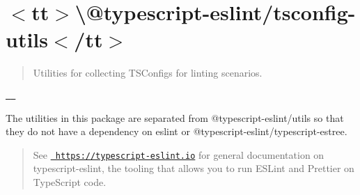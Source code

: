 \chapter{\texorpdfstring{$<$}{<}tt\texorpdfstring{$>$}{>}\textbackslash{}@typescript-\/eslint/tsconfig-\/utils\texorpdfstring{$<$}{<}/tt\texorpdfstring{$>$}{>}}
\hypertarget{md__project5___h_r_2_project5___h_r___front___end_2node__modules_2_0dtypescript-eslint_2tsconfig-utils_2_r_e_a_d_m_e}{}\label{md__project5___h_r_2_project5___h_r___front___end_2node__modules_2_0dtypescript-eslint_2tsconfig-utils_2_r_e_a_d_m_e}
\label{md__project5___h_r_2_project5___h_r___front___end_2node__modules_2_0dtypescript-eslint_2tsconfig-utils_2_r_e_a_d_m_e_autotoc_md474}%
%
 \begin{quote}
Utilities for collecting TSConfigs for linting scenarios. \end{quote}
\href{https://www.npmjs.com/package/@typescript-eslint/tsconfig-utils}{\texttt{ }} \href{https://www.npmjs.com/package/@typescript-eslint/tsconfig-utils}{\texttt{ }}

The utilities in this package are separated from {\ttfamily @typescript-\/eslint/utils} so that they do not have a dependency on {\ttfamily eslint} or {\ttfamily @typescript-\/eslint/typescript-\/estree}.

\begin{quote}
See \href{https://typescript-eslint.io}{\texttt{ https\+://typescript-\/eslint.\+io}} for general documentation on typescript-\/eslint, the tooling that allows you to run ESLint and Prettier on Type\+Script code. \end{quote}
